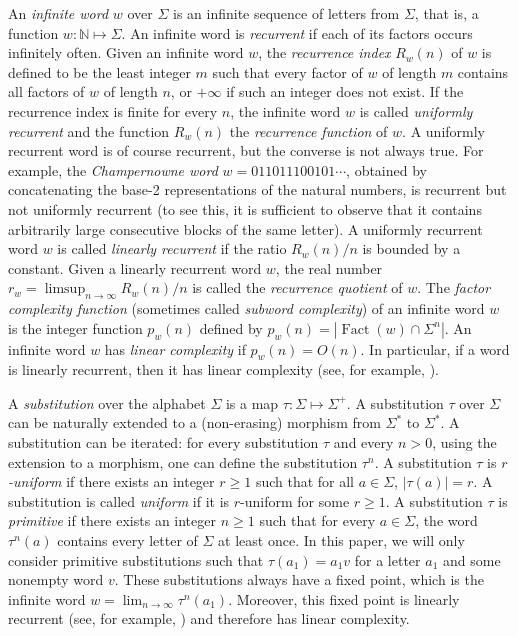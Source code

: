 \documentclass[11pt,reqno]{amsart}
\newcommand{\N}{{\mathbb N}}
\numberwithin{equation}{section}
\theoremstyle{plain}
\theoremstyle{definition}
\theoremstyle{remark}
\DeclareMathOperator{\Fact}{Fact}
\begin{document}
An \emph{infinite word} $w$ over $\Sigma$ is an infinite sequence of letters from $\Sigma$, that is, a function $w:\N \mapsto \Sigma$. %
An infinite word is \emph{recurrent} if each of its factors occurs infinitely often.
Given an infinite word $w$, the \emph{recurrence index} $R_w(n)$ of $w$ is defined to be the least integer $m$ such that every factor of $w$ of length $m$ contains all factors of $w$ of length $n$, or $+\infty$ if such an integer does not exist. If the recurrence index is finite for every $n$, the infinite word $w$ is called \emph{uniformly recurrent} and the function $R_w(n)$ the \emph{recurrence function} of $w$. A uniformly recurrent word is of course recurrent, but the converse is not always true. For example, the \emph{Champernowne word} $w=011011100101\cdots$, obtained by concatenating the base-2 representations of the natural numbers, is recurrent but not uniformly recurrent (to see this, it is sufficient to observe that it contains arbitrarily large consecutive blocks of the same letter).
A uniformly recurrent word  $w$ is called  \emph{linearly recurrent} if the ratio $R_w(n)/n$ is bounded by a constant. Given a linearly recurrent word $w$, the real number $r_w=\limsup_{n\to\infty}R_w(n)/n$ is called the \emph{recurrence quotient} of $w$. 
The \emph{factor complexity function} (sometimes called {\it subword 
complexity}) of an infinite word $w$ is the integer function $p_w(n)$ defined by $p_w(n)=|\Fact(w)\cap \Sigma^n|$. An infinite word $w$ has \emph{linear complexity} if $p_w(n)=O(n)$. In particular, if a word is linearly recurrent, then it has linear complexity (see, for example, \cite{Dur99}).

A \emph{substitution} over the alphabet $\Sigma$ is a map $\tau:\Sigma \mapsto \Sigma^+$. A substitution $\tau$ over $\Sigma$ can be naturally extended to a (non-erasing) morphism from $\Sigma^*$ to $\Sigma^*$.
A substitution can be iterated: for every substitution $\tau$ and every $n>0$, using the extension to a morphism, one can define the substitution $\tau^n$. A substitution $\tau$ is \emph{$r$-uniform} if there exists an integer $r\geq 1$ such that for all $a\in \Sigma$, $|\tau(a)|=r$. A substitution is called \emph{uniform} if it is $r$-uniform for some $r\geq 1$. A substitution $\tau$ is \emph{primitive} if there exists an integer $n\geq 1$ such that for every $a\in \Sigma$, the word $\tau^n(a)$ contains every letter of $\Sigma$ at least once. In this paper, we will only consider primitive substitutions such that $\tau(a_1)=a_1v$ for a letter $a_1$ and some nonempty word $v$. These substitutions always have a fixed point, which is the infinite word $w=\lim_{n\to\infty}\tau^n(a_1)$. Moreover, this fixed point is linearly recurrent (see, for example, \cite{DZ00}) and therefore has linear complexity.
\end{document}
